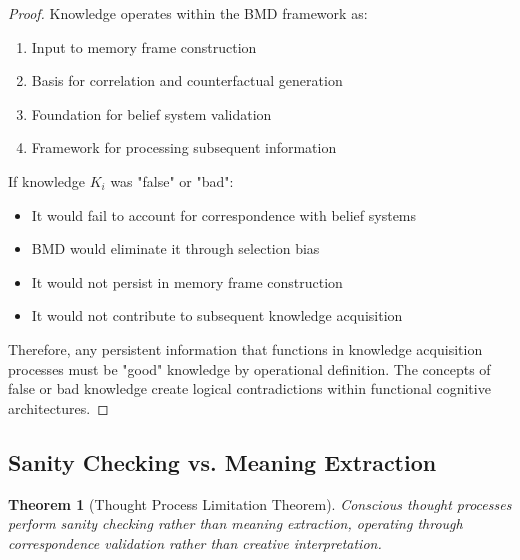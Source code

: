\documentclass[12pt,a4paper]{article}
\newtheorem{theorem}{Theorem}[section]
\begin{document}
\begin{proof}
Knowledge operates within the BMD framework as:
\begin{enumerate}
\item Input to memory frame construction
\item Basis for correlation and counterfactual generation  
\item Foundation for belief system validation
\item Framework for processing subsequent information
\end{enumerate}

If knowledge $K_i$ was "false" or "bad":
\begin{itemize}
\item It would fail to account for correspondence with belief systems
\item BMD would eliminate it through selection bias
\item It would not persist in memory frame construction
\item It would not contribute to subsequent knowledge acquisition
\end{itemize}

Therefore, any persistent information that functions in knowledge acquisition processes must be "good" knowledge by operational definition. The concepts of false or bad knowledge create logical contradictions within functional cognitive architectures.
\end{proof}

\subsection{Sanity Checking vs. Meaning Extraction}

\begin{theorem}[Thought Process Limitation Theorem]
Conscious thought processes perform sanity checking rather than meaning extraction, operating through correspondence validation rather than creative interpretation.
\end{theorem}
\end{document}
